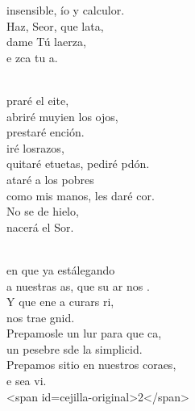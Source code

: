 \documentclass[12pt]{article}
\begin{document}
\begin{multicols*}{2}
\begin{cancion}
	insensible, ío y calculor.\\
	Haz, Seor, que lata, \\
	dame Tú laerza,\\
	e zca tu a.\\\jump\\
	\begin{chorus}%
	praré el eite, \\
	abriré muyien los ojos, \\
	prestaré ención.\\
	iré losrazos, \\
	quitaré etuetas, pediré pdón.\\
	ataré a los pobres \\
	como mis manos, les daré cor.\\
	No se de hielo,  \\
	nacerá el Sor.\\
	\end{chorus}%
	\jump\\
	en que ya estálegando  \\
	a nuestras as, que su ar nos .\\
	Y que ene a curars  ri, \\
	nos trae gnid.\\
	Prepamosle un lur para que ca,  \\
	un pesebre sde la simplicid.\\
	Prepamos sitio en nuestros coraes,\\
	e sea vi.\\
<span id=cejilla-original>2</span>\\
\end{cancion}%


\end{multicols*}
\end{document}
